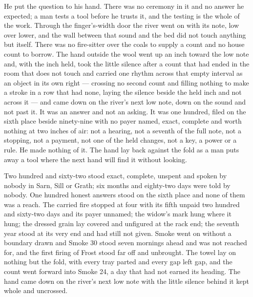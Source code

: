 He put the question to his hand. There was no ceremony in it and no answer he expected; a man tests a tool before he trusts it, and the testing is the whole of the work. Through the finger's-width door the river went on with its note, low over lower, and the wall between that sound and the bed did not touch anything but itself. There was no fire-sitter over the coals to supply a count and no house count to borrow. The hand outside the wool went up an inch toward the low note and, with the inch held, took the little silence after a count that had ended in the room that does not touch and carried one rhythm across that empty interval as an object in its own right --- crossing no second count and filling nothing to make a stroke in a row that had none, laying the silence beside the held inch and not across it --- and came down on the river's next low note, down on the sound and not past it. It was an answer and not an asking. It was one hundred, filed on the sixth place beside ninety-nine with no payer named, exact, complete and worth nothing at two inches of air: not a hearing, not a seventh of the full note, not a stopping, not a payment, not one of the held changes, not a key, a power or a rule. He made nothing of it. The hand lay back against the fold as a man puts away a tool where the next hand will find it without looking.

Two hundred and sixty-two stood exact, complete, unspent and spoken by nobody in Sarn, Sill or Grath; six months and eighty-two days were told by nobody. One hundred honest answers stood on the sixth place and none of them was a reach. The carried fire stopped at four with its fifth unpaid two hundred and sixty-two days and its payer unnamed; the widow's mark hung where it hung; the dressed grain lay covered and unfigured at the rack end; the seventh year stood at its very end and had still not given. Smoke went on without a boundary drawn and Smoke 30 stood seven mornings ahead and was not reached for, and the first firing of Frost stood far off and unbrought. The towel lay on nothing but the fold, with every tray parted and every gap left gap, and the count went forward into Smoke 24, a day that had not earned its heading. The hand came down on the river's next low note with the little silence behind it kept whole and uncrossed.
